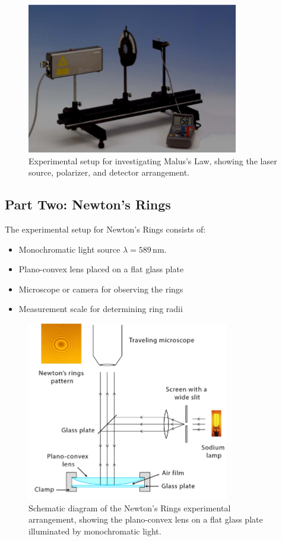 \documentclass[journal]{IEEEtran}
\begin{document}
\begin{figure}[H]
    \centering
    \includegraphics[width=0.8\linewidth]{../IMAGES/malus_law_setup.png}
    \caption{Experimental setup for investigating Malus's Law, showing the laser source, polarizer, and detector arrangement.}
    \label{fig:malus_setup}
\end{figure}


\subsection{Part Two: Newton's Rings}
The experimental setup for Newton's Rings consists of:
\begin{itemize}
    \item Monochromatic light source $\lambda = 589 \, \text{nm}$.
    \item Plano-convex lens placed on a flat glass plate
    \item Microscope or camera for observing the rings
    \item Measurement scale for determining ring radii
\end{itemize}

\begin{figure}[H]
    \centering
    \includegraphics[width=0.8\linewidth]{../IMAGES/newtons_rings_setup_diagram.png}
        \caption{Schematic diagram of the Newton's Rings experimental arrangement, showing the plano-convex lens on a flat glass plate illuminated by monochromatic light.}
    \label{fig:newtons_rings_setup}
\end{figure}
\end{document}

